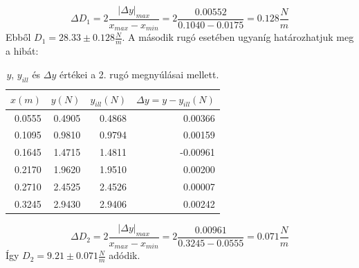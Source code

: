 \documentclass[10pt,pdftex]{report}
\begin{document}
\begin{equation*}
    \Delta D_1=2\frac{\left|\Delta y\right|_{max}}{x_{max}-x_{min}}=2\frac{0.00552}{0.1040-0.0175}=0.128\frac{N}{m}
\end{equation*}
Ebből $D_1=28.33\pm0.128\frac{N}{m}$. A második rugó esetében ugyaníg határozhatjuk meg a hibát:
\begin{table}[H]
    \centering
    \begin{tabular}{|r|r|r|r|}
        \hline
        $x(m)$ & $y(N)$ & $y_{ill}(N)$ & $\Delta y=y-y_{ill}(N)$ \\
        \hline
        0.0555 & 0.4905 & 0.4868 & 0.00366 \\
        \hline
        0.1095 & 0.9810 & 0.9794 & 0.00159 \\
        \hline
        0.1645 & 1.4715 & 1.4811 & -0.00961 \\
        \hline
        0.2170 & 1.9620 & 1.9510 & 0.00200 \\
        \hline
        0.2710 & 2.4525 & 2.4526 & 0.00007 \\
        \hline
        0.3245 & 2.9430 & 2.9406 & 0.00242 \\
        \hline
    \end{tabular}
    \caption{$y$, $y_{ill}$ és $\Delta y$ értékei a 2. rugó megnyúlásai mellett.}
\end{table}
\begin{equation*}
    \Delta D_2=2\frac{\left|\Delta y\right|_{max}}{x_{max}-x_{min}}=2\frac{0.00961}{0.3245-0.0555}=0.071\frac{N}{m}
\end{equation*}
Így $D_2=9.21\pm 0.071 \frac{N}{m}$ adódik.
\end{document}
